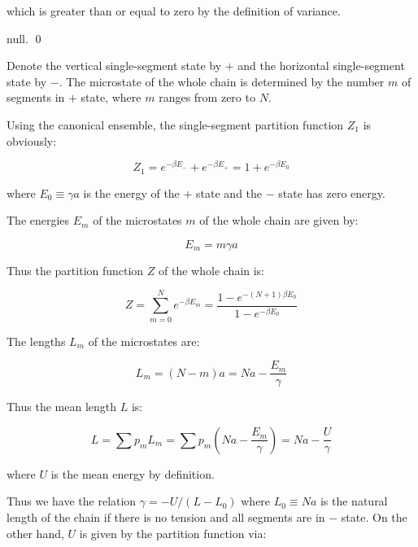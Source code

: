 \documentclass[12pt]{article}
\begin{document}
which is greater than or equal to zero by the definition of variance.

null.
\qed


Denote the vertical single-segment state by $+$ and the horizontal single-segment state by $-$. The microstate of the whole chain is determined by the number $m$ of segments in $+$ state, where $m$ ranges from zero to $N$.

Using the canonical ensemble, the single-segment partition function $Z_{1}$ is obviously:

\begin{equation}
Z_{1} = e^{-\beta E_{-}} + e^{-\beta E_{+}} = 1 + e^{-\beta E_{0}}
\end{equation}

where $E_{0} \equiv \gamma a$ is the energy of the $+$ state and the $-$ state has zero energy.

The energies $E_{m}$ of the microstates $m$ of the whole chain are given by:

\begin{equation}
E_{m} = m \gamma a
\end{equation}

Thus the partition function $Z$ of the whole chain is:

\begin{equation}
Z = \sum_{m=0}^{N} e^{-\beta E_{m}} = \frac{1 - e^{-(N+1)\beta E_{0}}}{1 - e^{-\beta E_{0}}}
\end{equation}

The lengths $L_{m}$ of the microstates are:

\begin{equation}
L_{m} = (N - m)a = Na - \frac{E_{m}}{\gamma}
\end{equation}

Thus the mean length $L$ is:

\begin{equation}
L = \sum p_{m} L_{m} = \sum p_{m} (Na - \frac{E_{m}}{\gamma}) = Na - \frac{U}{\gamma}
\end{equation}

where $U$ is the mean energy by definition.

Thus we have the relation $\gamma = -U/(L - L_{0})$ where $L_{0} \equiv Na$ is the natural length of the chain if there is no tension and all segments are in $-$ state. On the other hand, $U$ is given by the partition function via:
\end{document}
